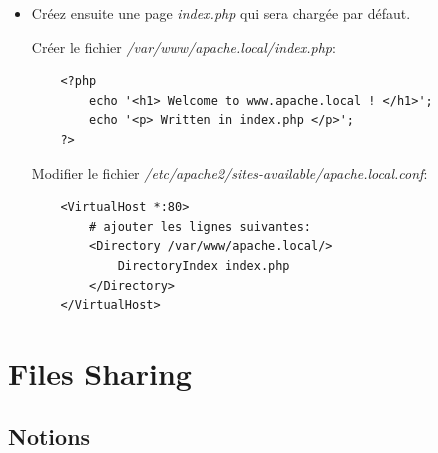 \documentclass[a4paper]{article}
\begin{document}
\begin{itemize}
\item Créez ensuite une page \textit{index.php} qui sera chargée par défaut.
\begin{example}
    Créer le fichier \textit{/var/www/apache.local/index.php}:
    \begin{verbatim}
    <?php
        echo '<h1> Welcome to www.apache.local ! </h1>';
        echo '<p> Written in index.php </p>';
    ?>
    \end{verbatim}
    Modifier le fichier \textit{/etc/apache2/sites-available/apache.local.conf}:
    \begin{verbatim}
    <VirtualHost *:80>
        # ajouter les lignes suivantes:
        <Directory /var/www/apache.local/>
            DirectoryIndex index.php
        </Directory>
    </VirtualHost>
    \end{verbatim}
\end{example}

\end{itemize}

















\section{Files Sharing}










\subsection{Notions}
\end{document}
